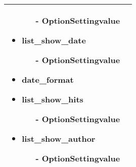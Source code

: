 \begin{minipage}{0.6\textwidth}
\begin{tabular}{|p{} | p{}|}
\begin{itemize}
\begin{enumerate}
			\item[-] OptionSettingvalue
		\end{enumerate}
	\item list\_show\_date
		\begin{enumerate}
			\item[-] OptionSettingvalue
		\end{enumerate} 
	\item date\_format 
	\item list\_show\_hits
		\begin{enumerate}
			\item[-] OptionSettingvalue
		\end{enumerate} 
	\item list\_show\_author
		\begin{enumerate}
			\item[-] OptionSettingvalue
		\end{enumerate} 	
\end{itemize}
\\
\hline
\end{tabular}
\end{minipage}

